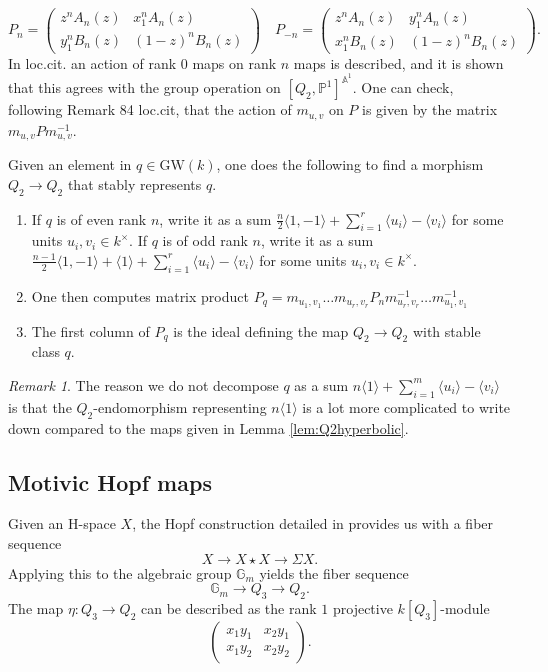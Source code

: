 \documentclass[11pt,leqno]{article}
\newcommand{\A}{{\mathbb A}}
\newcommand{\pone}{{\mathbb P}^1}
\renewcommand{\1}{{\rm 1\hspace*{-0.4ex}%
\rule{0.1ex}{1.52ex}\hspace*{0.2ex}}}
\newcommand{\gm}{{{\mathbb G}_{m}}}
\newcommand{\<}[1]{{\langle}#1 {\rangle}}
\theoremstyle{plain}
\theoremstyle{definition}
\theoremstyle{remark}
\newtheorem{rem}[thm]{Remark}
\numberwithin{equation}{section}
\begin{document}
 \[
 P_n = \begin{pmatrix}
     z^n A_n(z) & x_1^nA_n(z) \\ y_1^n B_n(z) & (1-z)^nB_n(z)
 \end{pmatrix} \quad P_{-n}= \begin{pmatrix}
     z^n A_n(z) & y_1^nA_n(z) \\ x_1^n B_n(z) & (1-z)^nB_n(z)
 \end{pmatrix}.\]
In loc.cit. an action of rank $0$ maps on rank $n$ maps is described, and it is shown that this agrees with the group operation on $[Q_2, \pone]^{\A^1}$. One can check, following Remark 84 loc.cit, that the action of $m_{u,v}$ on $P$ is given by the matrix $m_{u,v}Pm_{u,v}^{-1}$.

Given an element in $q \in \mathrm{GW}(k)$, one does the following to find a morphism $Q_2 \to Q_2 $ that stably represents $q$. 
\begin{enumerate}
    \item If $q$ is of even rank $n$, write it as a sum $\frac{n}{2}\langle 1, -1\rangle + \sum_{i=1}^r \langle u_i\rangle - \langle v_i\rangle$ for some units $u_i, v_i \in k^\times$. If $q$ is of odd rank $n$, write it as a sum $\frac{n-1}{2}\langle 1, -1\rangle +\langle 1\rangle  + \sum_{i=1}^r \langle u_i\rangle - \langle v_i\rangle$ for some units $u_i, v_i \in k^\times$.
    \item One then computes matrix product $P_q= m_{u_1,v_1}\ldots m_{u_r,v_r}P_n m_{u_r,v_r}^{-1}\ldots m_{u_1,v_1}^{-1}$
    \item The first column of $P_q$ is the ideal defining the map $Q_2 \to Q_2$ with stable class $q$. 
\end{enumerate}
\begin{rem}
    The reason we do not decompose $q$ as a sum $n\langle 1\rangle + \sum_{i=1}^m \langle u_i\rangle - \langle v_i\rangle$ is that the $Q_2$-endomorphism representing $n\langle 1\rangle $ is a lot more complicated to write down compared to the maps given in Lemma \ref{lem:Q2hyperbolic}.
\end{rem}
\subsection{Motivic Hopf maps}

Given an H-space $X$, the Hopf construction detailed in \cite[\S 7.3]{Morel08} provides us with a fiber sequence 
\begin{equation*}
    X \to X\star X \to \Sigma X. 
\end{equation*}
Applying this to the algebraic group $\gm$ yields the fiber sequence
\begin{equation*}
    \gm{} \to Q_3 \to Q_2.
\end{equation*}
The map $\eta \colon Q_3 \to Q_2$ can be described as the rank $1$ projective $k[Q_3]$-module 
\begin{equation*}
    \begin{pmatrix}
        x_1y_1 & x_2y_1 \\ x_1y_2 & x_2y_2
    \end{pmatrix}.
\end{equation*}
\end{document}
